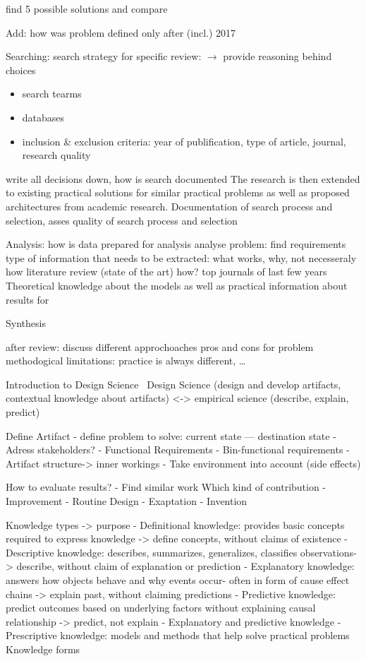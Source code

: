
find 5 possible solutions and compare

Add: how was problem defined
only after (incl.) 2017

Searching:
search strategy for specific review: $\rightarrow$ provide reasoning behind choices
\begin{itemize}
    \item search tearms
    \item databases
    \item inclusion \& exclusion criteria: year of publification, type of article, journal, research
        quality
\end{itemize}
write all decisions down, how is search documented
The research is then extended to existing practical solutions for similar practical problems as
well as proposed architectures from academic research.
Documentation of search process and selection, asses quality of search process and selection

Analysis:
how is data prepared for analysis
analyse problem: find requirements
type of information that needs to be extracted: what works, why, not necesseraly how
literature review (state of the art)
how? top journals of last few years
Theoretical knowledge about the models as well as practical information about results for

Synthesis

after review:
discuss different approchoaches pros and cons for problem
methodogical limitations: practice is always different, \ldots


Introduction to Design Science~\citep{johannesson_introduction_2021}
Design Science (design and develop artifacts, contextual knowledge about artifacts) <-> empirical science (describe, explain, predict)

Define Artifact
- define problem to solve: current state --- destination  state
- Adress stakeholders?
- Functional Requirements
- Bin-functional requirements
- Artifact structure-> inner workings
- Take environment into account (side effects)

How to evaluate results?
- Find similar work
Which kind of contribution
- Improvement
- Routine Design
- Exaptation
- Invention

Knowledge types -> purpose
- Definitional knowledge: provides basic concepts required to express knowledge -> define concepts, without claims of existence
- Descriptive knowledge: describes, summarizes, generalizes, classifies observations-> describe, without claim of explanation or prediction
- Explanatory knowledge: answers how objects behave and why events occur- often in form of cause effect chains -> explain past, without claiming predictions
- Predictive knowledge: predict outcomes based on underlying factors without explaining causal relationship -> predict, not explain
- Explanatory and predictive knowledge
- Prescriptive knowledge: models and methods that help solve practical problems
Knowledge forms

